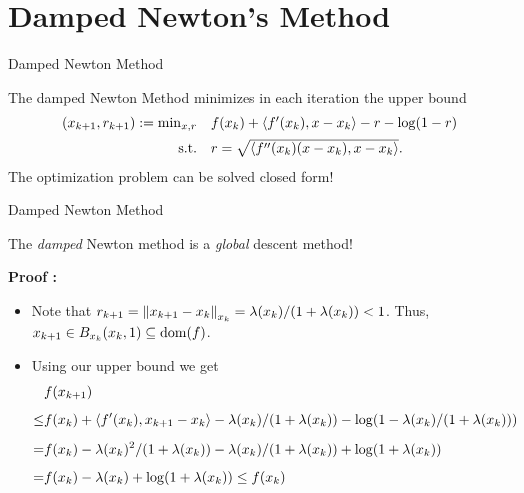 \documentclass[9pt]{beamer}
\begin{document}
\section{Damped Newton's Method}

\begin{frame}{Damped Newton Method}
  
  The damped Newton Method minimizes in each iteration the upper bound
  \[
    \begin{array}{rl}
      (x_{k+1}, r_{k+1}) := \min_{x, r} & f(x_k) + \left<f'(x_k), x-x_k\right> - r - \log(1-r)\\[0.5em]
      \mathrm{s.t.} & r = \sqrt{\left<f''(x_k)(x-x_k),  x-x_k\right>}.
    \end{array}
  \]
  The optimization problem can be solved closed form!

  \vfill


\end{frame}


\begin{frame}{Damped Newton Method}
  

  \vfill
  
  The \emph{damped} Newton method is a \emph{global} descent method!

  \vfill
  
  \textbf{Proof :}
  \begin{itemize}
  \item Note that $r_{k+1}=\left\|x_{k+1}-x_k\right\|_{x_k} = \lambda(x_k)/(1+\lambda(x_k)) < 1$. Thus, $x_{k+1} \in B_{x_k}(x_k, 1) \subseteq \operatorname{dom}(f)$.
  \item Using our upper bound we get
    \begin{align*}
      & f(x_{k+1})\\[0.5em]
       \leq & f(x_k) + \left<f'(x_k), x_{k+1}-x_k\right> - \lambda(x_k)/(1+\lambda(x_k)) - \log(1- \lambda(x_k)/(1+\lambda(x_k)))\\[0.5em]
      = & f(x_k) -\lambda(x_k)^2/(1+\lambda(x_k)) - \lambda(x_k)/(1+\lambda(x_k)) + \log(1+\lambda(x_k))\\[0.5em]
      = & f(x_k) - \lambda(x_k) + \log(1+\lambda(x_k)) \leq f(x_k)
    \end{align*}
  \end{itemize}
\end{frame}
\end{document}
